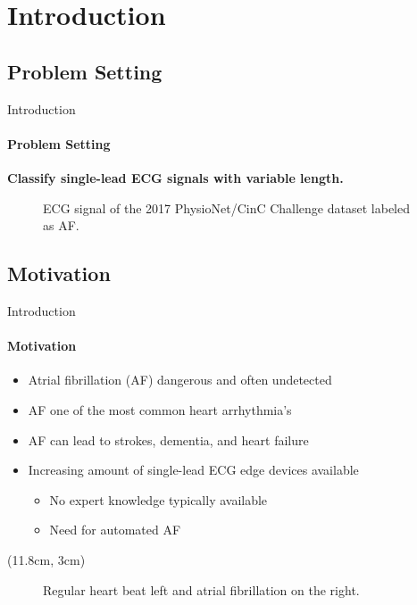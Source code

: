 \section{Introduction}

\subsection{Problem Setting}
\begin{frame}[c]{Introduction}
\framesubtitle{Problem Setting}
    \begin{center}
        \begin{large}
            \textbf{Classify single-lead ECG signals with variable length.}
        \end{large}
    \end{center}
    \vspace{0.5cm}
    \begin{figure}[!ht]
        \setlength{\figH}{3.75cm}
        \setlength{\figW}{0.95\textwidth}
        \centering
        
        \caption{ECG signal of the 2017 PhysioNet/CinC Challenge dataset \cite{Clifford2017} labeled as AF.}
        \label{fig:ecg_signal_A}
    \end{figure}
\end{frame}

\subsection{Motivation}
\begin{frame}{Introduction}
\framesubtitle{Motivation}
    \begin{itemize}
        \item Atrial fibrillation (AF) dangerous and often undetected
        \item AF one of the most common heart arrhythmia's
        \item AF can lead to strokes, dementia, and heart failure
        \item Increasing amount of single-lead ECG edge devices available
        \begin{itemize}
            \item No expert knowledge typically available
            \item Need for automated AF
        \end{itemize}
    \end{itemize}
    \begin{textblock*}{3cm}(11.8cm, 3cm)
        \raggedright
        \cite{Becker2006}
        \cite{Herold2019}
    \end{textblock*}
    \pause
    \begin{figure}[!ht] 
        \centering
        
        \vspace{-0.15cm}
        \caption{Regular heart beat left and atrial fibrillation on the right.}
        \label{fig:beat}
    \end{figure}
\end{frame}

